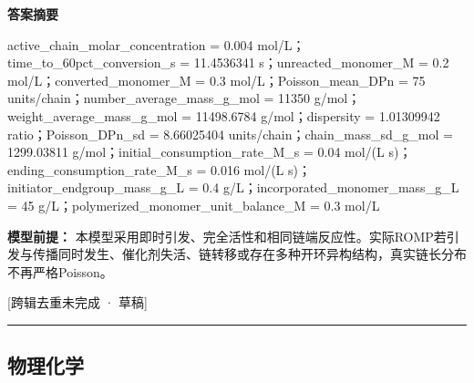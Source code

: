 \documentclass[UTF8,11pt,a4paper]{ctexart}
\begin{document}
\noindent\textbf{答案摘要}\par
active\_chain\_molar\_concentration = 0.004 mol/L；time\_to\_60pct\_conversion\_s = 11.4536341 s；unreacted\_monomer\_M = 0.2 mol/L；converted\_monomer\_M = 0.3 mol/L；Poisson\_mean\_DPn = 75 units/chain；number\_average\_mass\_g\_mol = 11350 g/mol；weight\_average\_mass\_g\_mol = 11498.6784 g/mol；dispersity = 1.01309942 ratio；Poisson\_DPn\_sd = 8.66025404 units/chain；chain\_mass\_sd\_g\_mol = 1299.03811 g/mol；initial\_consumption\_rate\_M\_s = 0.04 mol/(L s)；ending\_consumption\_rate\_M\_s = 0.016 mol/(L s)；initiator\_endgroup\_mass\_g\_L = 0.4 g/L；incorporated\_monomer\_mass\_g\_L = 45 g/L；polymerized\_monomer\_unit\_balance\_M = 0.3 mol/L\par
\noindent\textbf{模型前提：}
本模型采用即时引发、完全活性和相同链端反应性。实际ROMP若引发与传播同时发生、催化剂失活、链转移或存在多种开环异构结构，真实链长分布不再严格Poisson。\par
\noindent\textcolor{red!65!black}{[跨辑去重未完成 · 草稿]} \par
\medskip\hrule\medskip
\subsection*{物理化学}
\end{document}
